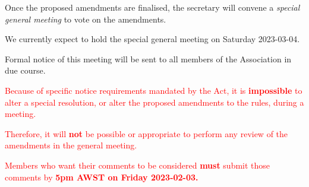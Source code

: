 \documentclass[../constitution.tex]{subfiles}
\begin{document}
\bigskip

Once the proposed amendments are finalised, the secretary will convene a \textit{special general meeting} to vote on the amendments.

We currently expect to hold the special general meeting on Saturday 2023-03-04.

Formal notice of this meeting will be sent to all members of the Association in due course.


\bigskip

\large

\textcolor{red}{Because of specific notice requirements mandated by the Act, it is \textbf{impossible} to alter a special resolution, or alter the proposed amendments to the rules, during a meeting.}

\textcolor{red}{Therefore, it will \textbf{not} be possible or appropriate to perform any review of the amendments in the general meeting.}

\textcolor{red}{Members who want their comments to be considered \textbf{must} submit those comments by \textbf{5pm AWST on Friday 2023-02-03.}}
\end{document}
